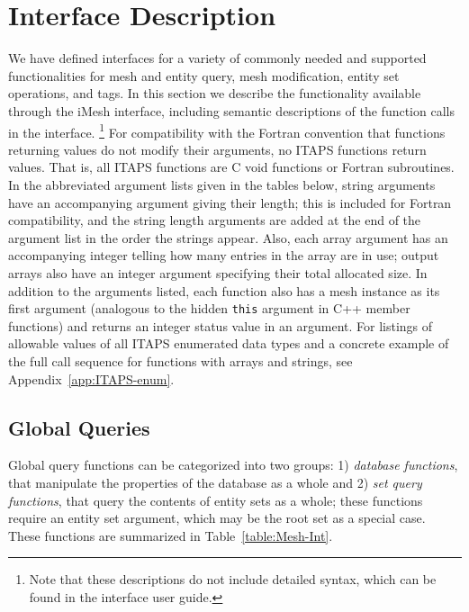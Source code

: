 \section{Interface Description\label{sec:Interface}}

We have defined interfaces for a variety of commonly needed and supported
functionalities for mesh and entity query, mesh modification, entity
set operations, and tags. In this section we describe the functionality
available through the iMesh interface, including semantic descriptions
of the function calls in the interface.%
\footnote{Note that these descriptions do not include detailed syntax, which
can be found in the interface user guide\cite{TSTTB-UG,TSTTM-UG}.%
} For compatibility with the Fortran convention that functions returning
values do not modify their arguments, no ITAPS functions return values.
That is, all ITAPS functions are C void functions or Fortran subroutines.
In the abbreviated argument lists given in the tables below, string
arguments have an accompanying argument giving their length; this
is included for Fortran compatibility, and the string length arguments
are added at the end of the argument list in the order the strings
appear. Also, each array argument has an accompanying integer telling
how many entries in the array are in use; output arrays also have
an integer argument specifying their total allocated size. In addition
to the arguments listed, each function also has a mesh instance as
its first argument (analogous to the hidden \texttt{this} argument
in C++ member functions) and returns an integer status value in an
argument. For listings of allowable values of all ITAPS enumerated
data types and a concrete example of the full call sequence for functions
with arrays and strings, see Appendix~\ref{app:ITAPS-enum}.


\subsection{Global Queries\label{sub:Mesh-Interface}}

Global query functions can be categorized into two groups: 1) \emph{database
functions}, that manipulate the properties of the database as a whole
and 2) \emph{set query functions}, that query the contents of entity
sets as a whole; these functions require an entity set argument, which
may be the root set as a special case. These functions are summarized
in Table~\ref{table:Mesh-Int}.

